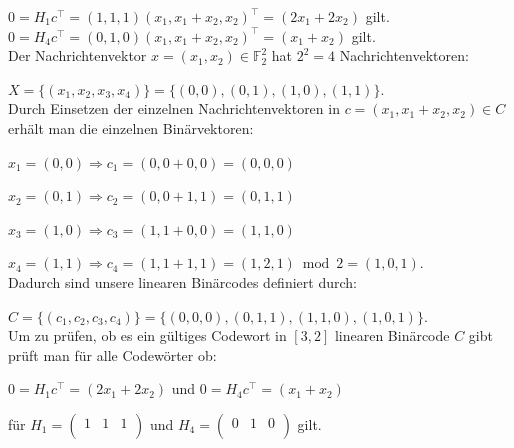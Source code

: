\begin{Beispiel}
    $0 = H_1c^\intercal = (1,1,1) (x_1, x_1 + x_2, x_2)^\intercal = (2x_1+2x_2)$ gilt.\\
    $0 = H_4c^\intercal = (0,1,0) (x_1, x_1 + x_2, x_2)^\intercal = (x_1+x_2)$ gilt. \cite[S. 5]{huffman}\\
    
    
    Der Nachrichtenvektor $x = (x_{1},x_{2}) \in \mathbb{F}_{2}^{2}$  hat $2^2= 4$ Nachrichtenvektoren:
    
    
    $X = \{(x_1, x_2, x_3, x_4)\} = \{(0,0),(0,1),(1,0),(1,1)\}.$\\
    
    Durch Einsetzen der einzelnen Nachrichtenvektoren in $c = (x_1,x_1+x_2,x_2) \in C$\\ erhält man die einzelnen Binärvektoren:
    
    $x_1= (0,0)\Rightarrow c_1=(0,0+0,0)=(0,0,0)$
    
    $x_2= (0,1)\Rightarrow c_2=(0,0+1,1)=(0,1,1)$
    
    $x_3= (1,0)\Rightarrow c_3=(1,1+0,0)=(1,1,0)$
    
    $x_4= (1,1)\Rightarrow c_4=(1,1+1,1)=(1,2,1)\bmod 2=(1,0,1).$\\
    
    
    Dadurch sind unsere linearen Binärcodes definiert durch:
    
    $C = \{(c_1, c_2, c_3, c_4)\} = \{(0,0,0),(0,1,1),(1,1,0),(1,0,1)\}.$\\
    
    
    Um zu prüfen, ob es ein gültiges Codewort in $[3,2]$ linearen Binärcode \(C\) gibt prüft man für alle Codewörter ob:
    
    
    $0 = H_1c^\intercal = (2x_1+2x_2)$ und 
    $0 = H_4c^\intercal = (x_1+x_2)$
    
    für $H_1=\left( \begin{array}{rrr}
    1 & 1 & 1 \\
    \end{array}\right) 
    $ und
    $H_4=\left( \begin{array}{rrr}
    0 & 1 & 0 \\
    \end{array}\right)
    $ gilt.\\
    

\end{Beispiel}
